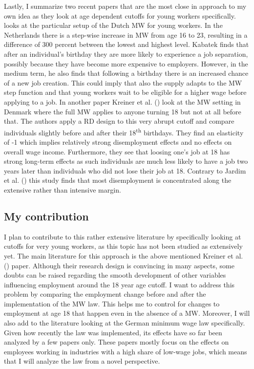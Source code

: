 \documentclass[11pt]{scrartcl}
\begin{document}
Lastly, I summarize two recent papers that are the most close in approach to my own idea as they look at age dependent cutoffs for young workers specifically. \textcite{KabatekBirthday2020} looks at the particular setup of the Dutch MW for young workers. In the Netherlands there is a step-wise increase in MW from age 16 to 23, resulting in a difference of 300 percent between the lowest and highest level. Kabatek finds that after an individual's birthday they are more likely to experience a job separation, possibly because they have become more expensive to employers. However, in the medium term, he also finds that following a birthday there is an increased chance of a new job creation. This could imply that also the supply adapts to the MW step function and that young workers wait to be eligible for a higher wage before applying to a job. In another paper Kreiner et al. (\citeyear{KreinerReckMW2020}) look at the MW setting in Denmark where the full MW applies to anyone turning 18 but not at all before that. The authors apply a RD design to this very abrupt cutoff and compare individuals slightly before and after their 18\textsuperscript{th} birthdays. They find an elasticity of -1 which implies relatively strong disemployment effects and no effects on overall wage income. Furthermore, they see that loosing one's job at 18 has strong long-term effects as such individuals are much less likely to have a job two years later than individuals who did not lose their job at 18. Contrary to Jardim et al. (\citeyear{JardimMWSeattle2017}) this study finds that most disemployment is concentrated along the extensive rather than intensive margin. \\

\subsection*{My contribution}
I plan to contribute to this rather extensive literature by specifically looking at cutoffs for very young workers, as this topic has not been studied as extensively yet. The main literature for this approach is the above mentioned Kreiner et al. (\citeyear{KreinerReckMW2020}) paper. Although their research design is convincing in many aspects, some doubts can be raised regarding the smooth development of other variables influencing employment around the 18 year age cutoff. I want to address this problem by comparing the employment change before and after the implementation of the MW law. This helps me to control for changes to employment at age 18 that happen even in the absence of a MW. Moreover, I will also add to the literature looking at the German minimum wage law specifically. Given how recently the law was implemented, its effects have so far been analyzed by a few papers only. These papers mostly focus on the effects on employees working in industries with a high share of low-wage jobs, which means that I will analyze the law from a novel perspective.
\end{document}
